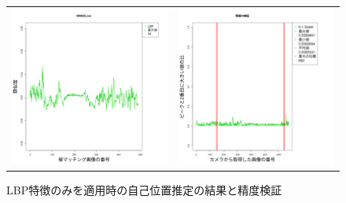\documentclass[titlepage,dvipdfmx]{jsarticle}
\begin{document}
\begin{figure}[H]
  \centering
  \begin{tabular}{cc}
    \begin{minipage}[b]{0.5\linewidth}
      \centering
      \includegraphics[pagebox=cropbox, scale=0.25]{sotuken_png/resultLBP_000652.png}
    \end{minipage}
    &
    \begin{minipage}[b]{0.5\linewidth}
      \centering
      \includegraphics[pagebox=cropbox, scale=0.25]{sotuken_png/peak/peak_LBP.png}
    \end{minipage}
  \end{tabular}
  \caption{LBP特徴のみを適用時の自己位置推定の結果と精度検証}
  \label{LBPR}
\end{figure}
\end{document}
